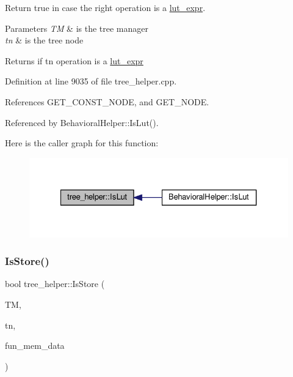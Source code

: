 Return true in case the right operation is a \hyperlink{structlut__expr}{lut\+\_\+expr}. 


\begin{DoxyParams}{Parameters}
{\em TM} & is the tree manager \\
\hline
{\em tn} & is the tree node \\
\hline
\end{DoxyParams}
\begin{DoxyReturn}{Returns}
if tn operation is a \hyperlink{structlut__expr}{lut\+\_\+expr} 
\end{DoxyReturn}


Definition at line 9035 of file tree\+\_\+helper.\+cpp.



References G\+E\+T\+\_\+\+C\+O\+N\+S\+T\+\_\+\+N\+O\+DE, and G\+E\+T\+\_\+\+N\+O\+DE.



Referenced by Behavioral\+Helper\+::\+Is\+Lut().

Here is the caller graph for this function\+:
\nopagebreak
\begin{figure}[H]
\begin{center}
\leavevmode
\includegraphics[width=327pt]{d7/d99/classtree__helper_a3a01e21342fdb1f1c65b383e8bc12d4b_icgraph}
\end{center}
\end{figure}
\mbox{\label{classtree__helper_a0f38d238eda35ae3e6fb4bed5baa7ace}} 
\subsubsection{\texorpdfstring{Is\+Store()}{IsStore()}}
{\footnotesize\ttfamily bool tree\+\_\+helper\+::\+Is\+Store (\begin{DoxyParamCaption}\item[{const \hyperlink{tree__manager_8hpp_a792e3f1f892d7d997a8d8a4a12e39346}{tree\+\_\+manager\+Const\+Ref} \&}]{TM,  }\item[{const \hyperlink{tree__node_8hpp_a3cf5d02292c940f3892425a5b5fdec3c}{tree\+\_\+node\+Const\+Ref} \&}]{tn,  }\item[{const \hyperlink{classCustomOrderedSet}{Custom\+Ordered\+Set}$<$ unsigned int $>$ \&}]{fun\+\_\+mem\+\_\+data }\end{DoxyParamCaption})\hspace{0.3cm}{\ttfamily [static]}}



